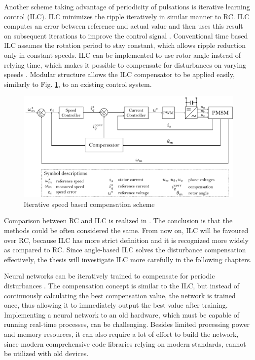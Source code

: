 Another scheme taking advantage of periodicity of pulsations is iterative learning control (ILC). ILC minimizes the ripple iteratively in similar manner to RC. ILC computes an error between reference and actual value and then uses this result on subsequent iterations to improve the control signal \cite{ILC:2004, ILC:2005, ILC:2018}. Conventional time based ILC assumes the rotation period to stay constant, which allows ripple reduction only in constant speeds. ILC can be implemented to use rotor angle instead of relying time, which makes it possible to compensate for disturbances on varying speeds \cite{ILC:2012}. Modular structure allows the ILC compensator to be applied easily, similarly to Fig. \ref{Compensator_control_diag}, to an existing control system.
\begin{figure}[ht] 
    \centering
    \includegraphics[width=1.0\linewidth]{images/compensator.pdf} 
    \caption{Iterative speed based compensation scheme}
    \label{Compensator_control_diag} 
\end{figure}

Comparison between RC and ILC is realized in \cite{ILC:RC:R2R:2009}. The conclusion is that the methods could be often considered the same. From now on, ILC will be favoured over RC, because ILC has more strict definition \cite{ILC:1998} and it is recognized more widely \cite{ILC:RC:R2R:2009} as compared to RC. Since angle-based ILC solves the disturbance compensation effectively, the thesis will investigate ILC more carefully in the following chapters.

Neural networks can be iteratively trained to compensate for periodic disturbances \cite{CTR_SW:2017}. The compensation concept is similar to the ILC, but instead of continuously calculating the best compensation value, the network is trained once, thus allowing it to immediately output the best value after training. Implementing a neural network to an old hardware, which must be capable of running real-time processes, can be challenging. Besides limited processing power and memory resources, it can also require a lot of effort to build the network, since modern comprehensive code libraries relying on modern standards, cannot be utilized with old devices.

